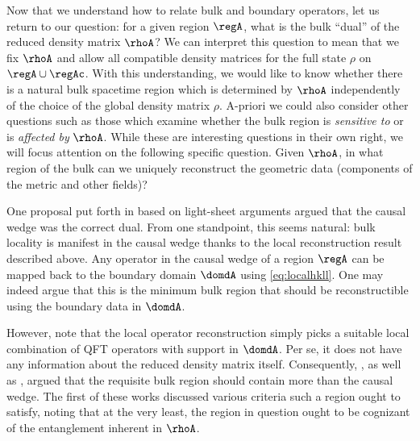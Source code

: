 \documentclass[12pt,openany]{book}
\begin{document}
 Now that we understand how to relate bulk and boundary operators, let us return to our question: for a given region $\regA$, what is the bulk ``dual'' of the reduced density matrix $\rhoA$?  We can interpret this question to mean that  we fix  $\rhoA$ and allow all compatible density matrices for the full state $\rho$ on $\regA \cup \regAc$.  With this understanding, we would like to know whether there is a natural  bulk spacetime region which is determined by $\rhoA$ independently of the choice of the global density matrix $\rho$.  A-priori we could also consider other questions such as those which examine whether the bulk region  is \emph{sensitive to} or is \emph{affected by} $\rhoA$. While these are interesting questions in their own right, we will focus attention on the following  specific question. Given $\rhoA$, in what region of the bulk can we uniquely reconstruct the geometric data (components of the metric and other fields)?

One proposal put forth in \cite{Bousso:2012sj} based on light-sheet arguments argued that the causal wedge was the correct dual. From one standpoint, this seems natural: bulk locality is manifest in the causal wedge thanks to the local reconstruction result described above. Any operator in the causal wedge of a region $\regA$ can be mapped back to the boundary domain $\domdA$ using \eqref{eq:localhkll}. One may indeed argue that this is the minimum bulk region that should be reconstructible using the boundary data in $\domdA$.

However, note that the local operator reconstruction simply picks a suitable local combination of QFT operators with support in $\domdA$. Per se, it does not have any information about the reduced density matrix itself. Consequently,  \cite{Czech:2012bh}, as well as \cite{Hubeny:2012wa, Wall:2012uf}, argued that the requisite bulk region should contain more than the causal wedge.  The first of these works discussed various criteria such a region ought to satisfy, noting that at the very least, the region in question ought to be cognizant of the  entanglement inherent in $\rhoA$.
\end{document}
